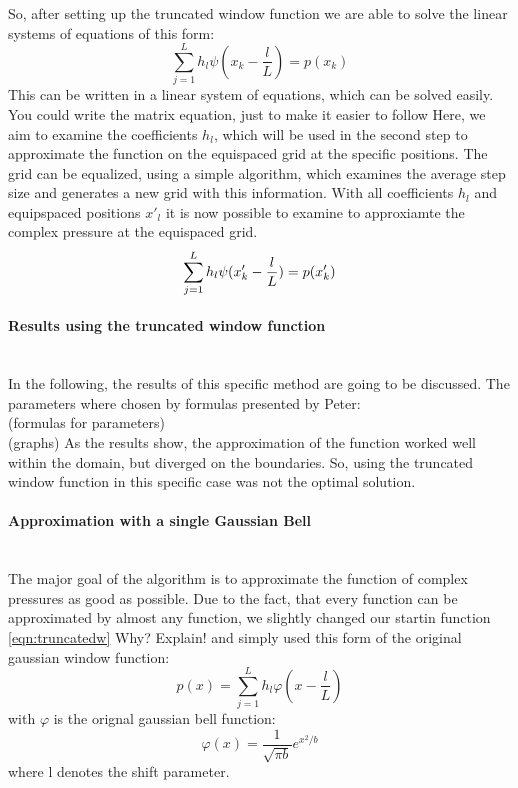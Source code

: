 \documentclass{article}
\begin{document}
So, after setting up the truncated window function we are able to solve the linear systems of equations of this form:
\begin{equation}
\sum\limits_{j=1}^L h_{l}\psi(x_{k}-\frac{l}{L})=p(x_{k})
\end{equation}
This can be written in a linear system of equations, which can be solved easily. {\color{red} You could write the matrix equation, just to make it easier to follow}
Here, we aim to examine the coefficients $h_{l}$, which will be used in the second step to approximate the function on the equispaced grid at the specific positions.
The grid can be equalized, using a simple algorithm, which examines the average step size and generates a new grid with this information.
With all coefficients $h_{l}$ and equipspaced positions $x'_{l}$ it is now possible to examine to approxiamte the complex pressure at the equispaced grid. 
\begin{equation}
 \sum\limits_{j=1}^L h_{l}\psi(x'_{k}-\frac{l}{L})=p(x'_{k})\notag
\end{equation}

\paragraph{Results using the truncated window function} $ $ \\[1ex]
In the following, the results of this specific method are going to be discussed.
The parameters where chosen by formulas presented by Peter: \\
	(formulas for parameters) \\
	(graphs)
As the results show, the approximation of the function worked well within the domain, but diverged on the boundaries.
So, using the truncated window function in this specific case was not the optimal solution. \\[1ex]

\paragraph{Approximation with a single Gaussian Bell}  $ $ \\[1ex]
The major goal of the algorithm is to approximate the function of complex pressures as good as possible.
Due to the fact, that every function can be approximated by almost any function, we slightly changed our startin function \eqref{eqn:truncatedw} {\color{red} Why? Explain!} and simply used this form of the original gaussian window function: 
\begin{equation}
 p(x)=\sum\limits_{j=1}^L h_{l}\varphi(x-\frac{l}{L})
\end{equation}
with $\varphi$ is the orignal gaussian bell function: 
\begin{equation}
\varphi(x)= \frac{1}{\sqrt{\pi b}}  e^{x^2/b}
\end{equation}
where l denotes the shift parameter.
\end{document}
